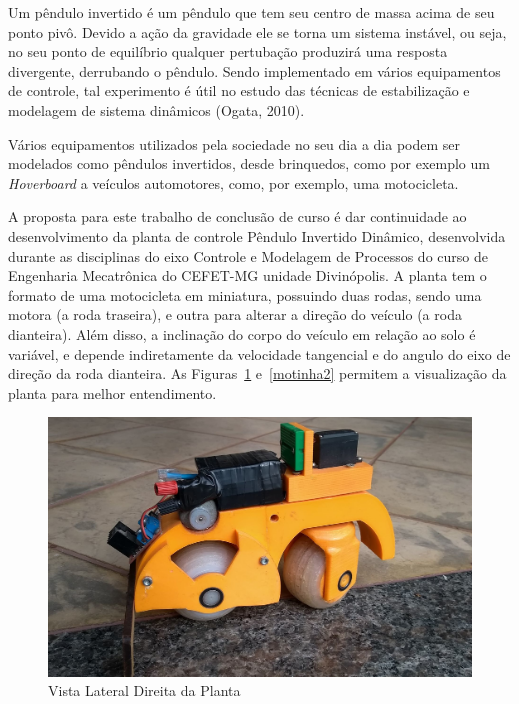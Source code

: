 \documentclass[conference,harvard,brazil,english]{sbatex}
\begin{document}
        Um pêndulo invertido é um pêndulo que tem seu centro de massa acima de seu ponto pivô. Devido a ação da gravidade ele se torna um sistema instável, ou seja, no seu ponto de equilíbrio qualquer pertubação produzirá uma resposta divergente, derrubando o pêndulo. Sendo implementado em vários equipamentos de controle, tal experimento é útil no estudo das técnicas de estabilização e modelagem de sistema dinâmicos (Ogata, 2010). 
        
        Vários equipamentos utilizados pela sociedade no seu dia a dia podem ser modelados como pêndulos invertidos, desde brinquedos, como por exemplo um \textit{Hoverboard} a veículos automotores, como, por exemplo, uma motocicleta. %
        
        A proposta para este trabalho de conclusão de curso é dar continuidade ao desenvolvimento da planta de controle Pêndulo Invertido Dinâmico, desenvolvida durante as disciplinas do eixo Controle e Modelagem de Processos do curso de Engenharia Mecatrônica do CEFET-MG unidade Divinópolis. A planta tem o formato de uma motocicleta em miniatura, possuindo duas rodas, sendo uma motora (a roda traseira), e outra para alterar a direção do veículo (a roda dianteira). Além disso, a inclinação do corpo do veículo em relação ao solo é variável, e depende indiretamente da velocidade tangencial e do angulo do eixo de direção da roda dianteira. As Figuras~\ref{motinha1} e~\ref{motinha2} permitem a visualização da planta para melhor entendimento.
        
        \begin{figure}[!ht] 
            \centering
            \includegraphics[width=\columnwidth]{imagens/motinha1.jpg}{
            \small
            \centering
            \caption{Vista Lateral Direita da Planta}
            \label{motinha1}}
        \end{figure}
        
\end{document}
